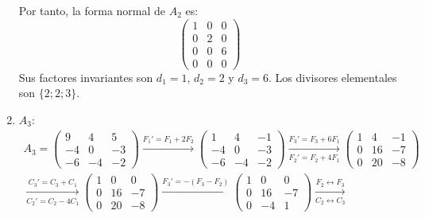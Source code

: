\begin{ejercicio}
\begin{enumerate}
        Por tanto, la forma normal de $A_2$ es:
        \begin{equation*}
            \begin{pmatrix}
                1 & 0 & 0 \\
                0 & 2 & 0 \\
                0 & 0 & 6 \\
                0 & 0 & 0
            \end{pmatrix}
        \end{equation*}
        Sus factores invariantes son $d_1=1$, $d_2=2$ y $d_3=6$.
        Los divisores elementales son $\{ 2; 2; 3\}$.
        \item $A_3$:
        \begin{multline*}
            A_3 = \begin{pmatrix}
                9 & 4 & 5 \\
                -4 & 0 & -3 \\
                -6 & -4 & -2
            \end{pmatrix}
            \xrightarrow{F_1'=F_1+2F_2}
            \begin{pmatrix}
                1 & 4 & -1 \\
                -4 & 0 & -3 \\
                -6 & -4 & -2
            \end{pmatrix}
            \xrightarrow[F_2'=F_2+4F_1]{F_3'=F_3+6F_1}
            \begin{pmatrix}
                1 & 4 & -1 \\
                0 & 16 & -7 \\
                0 & 20 & -8
            \end{pmatrix}\\
            \xrightarrow[C_2'=C_2-4C_1]{C_3'=C_3+C_1}
            \begin{pmatrix}
                1 & 0 & 0 \\
                0 & 16 & -7 \\
                0 & 20 & -8
            \end{pmatrix}
            \xrightarrow{F_3'=-(F_3-F_2)}
            \begin{pmatrix}
                1 & 0 & 0 \\
                0 & 16 & -7 \\
                0 & -4 & 1
            \end{pmatrix}
            \xrightarrow[C_2\leftrightarrow C_3]{F_2\leftrightarrow F_3}

\end{multline*}
\end{enumerate}
\end{ejercicio}
